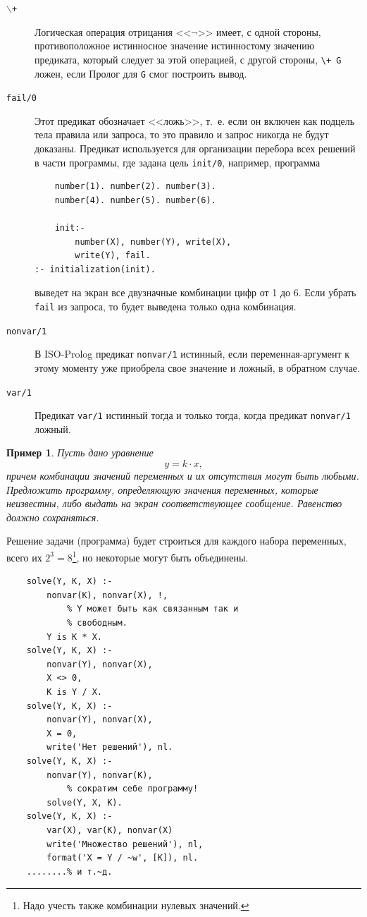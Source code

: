 \documentclass[12pt, openany, twoside]{book} %
\newtheorem{example}{Пример}[chapter]
\begin{document}
\begin{description}
\item[{\tt $\backslash$+}] Логическая операция отрицания <<$\neg$>> имеет, с одной стороны, противоположное истинносное значение истинностому значению пре\-ди\-ка\-та, который следует за этой операцией, с другой стороны, {\tt \verb|\+| G} ложен, если Пролог для  {\tt G} смог построить вывод.
\item[\tt fail/0] Этот предикат обозначает <<ложь>>, т.~е. если он включен как подцель тела правила или запроса, то это правило и запрос никогда не будут доказаны. Предикат используется для организации перебора всех решений в части программы, где задана цель \texttt{init/0}, например, программа
{\tt \begin{verbatim}
    number(1). number(2). number(3).
    number(4). number(5). number(6).

    init:-
        number(X), number(Y), write(X),
        write(Y), fail.
:- initialization(init).
\end{verbatim}}
выведет на экран все двузначные комбинации цифр от 1 до 6. Если убрать {\tt fail} из запроса, то будет выведена только одна комбинация.
\item[\tt nonvar/1] В ISO-Prolog предикат {\tt nonvar/1} истинный, если пе\-ре\-мен\-ная-аргумент к этому моменту уже приобрела свое значение и ложный, в обратном случае.
\item[\tt var/1] Предикат {\tt var/1} истинный тогда и только тогда, когда предикат {\tt nonvar/1} ложный.
\end{description}

\begin{example}  Пусть дано уравнение
$$
    y=k\cdot x,
$$
причем комбинации значений переменных и их отсутствия могут быть любыми. Предложить программу, определяющую значения переменных, которые неизвестны,  либо выдать на экран соответствующее сообщение. Равенство должно сохраняться.
\end{example}

Решение задачи (программа) будет строиться для каждого набора переменных, всего их $2^3=8$\footnote{Надо учесть также комбинации нулевых значений.}, но некоторые могут быть объединены.

{\tt \begin{verbatim}
    solve(Y, K, X) :-
        nonvar(K), nonvar(X), !,
            % Y может быть как связанным так и
            % свободным.
        Y is K * X.
    solve(Y, K, X) :-
        nonvar(Y), nonvar(X),
        X <> 0,
        K is Y / X.
    solve(Y, K, X) :-
        nonvar(Y), nonvar(X),
        X = 0,
        write('Нет решений'), nl.
    solve(Y, K, X) :-
        nonvar(Y), nonvar(K),
            % сократим себе программу!
        solve(Y, X, K).
    solve(Y, K, X) :-
        var(X), var(K), nonvar(X)
        write('Множество решений'), nl,
        format('X = Y / ~w', [K]), nl.
    ........% и т.~д.
\end{verbatim}}
\end{document}
